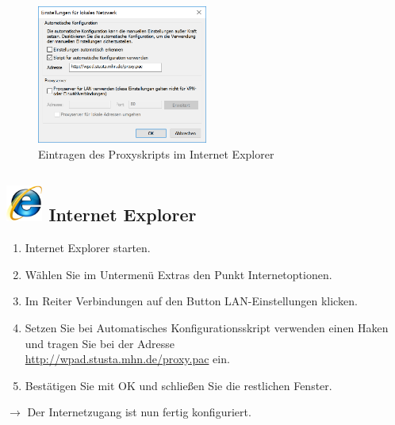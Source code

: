 \documentclass[a4paper,12pt]{scrartcl}
\begin{document}
\begin{figure}
	\begin{center}
		\includegraphics[width=0.5\textwidth,keepaspectratio]{Bilder/Proxy_IE}
	\end{center}
	\caption{Eintragen des Proxyskripts im Internet Explorer}
\end{figure}

\subsection*{\includegraphics[height=1.2cm,keepaspectratio]{Bilder/Internet_Explorer_7_Logo} Internet Explorer}
\begin{enumerate}
	\item Internet Explorer starten.
	\item Wählen Sie im Untermenü Extras den Punkt Internetoptionen.
	\item Im Reiter Verbindungen auf den Button LAN-Ein\-stellungen klicken.
	\item Setzen Sie bei Automatisches Konfigurationsskript verwenden einen Haken und tragen Sie bei der Adresse \\ \url{http://wpad.stusta.mhn.de/proxy.pac} ein.
	\item Bestätigen Sie mit OK und schließen Sie die restlichen Fenster.
\end{enumerate}
$\rightarrow$ Der Internetzugang ist nun fertig konfiguriert.
\end{document}
